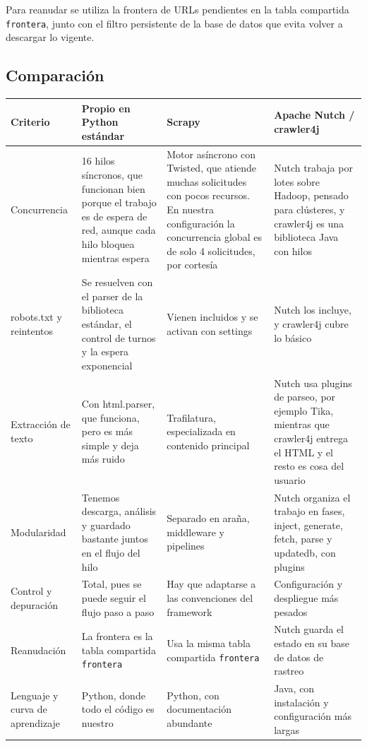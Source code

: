 \documentclass[11pt,spanish]{article}
\begin{document}
Para reanudar se utiliza la frontera de URLs pendientes en la tabla compartida \texttt{frontera}, junto con el filtro persistente de la base de datos que evita volver a descargar lo vigente.

\subsection{Comparación}

\begin{center}
\small
\begin{tabularx}{\linewidth}{lYYY}
\toprule
\textbf{Criterio} & \textbf{Propio en Python estándar} & \textbf{Scrapy} & \textbf{Apache Nutch / crawler4j} \\
\midrule
Concurrencia & 16 hilos síncronos, que funcionan bien porque el trabajo es de espera de red, aunque cada hilo bloquea mientras espera & Motor asíncrono con Twisted, que atiende muchas solicitudes con pocos recursos. En nuestra configuración la concurrencia global es de solo 4 solicitudes, por cortesía & Nutch trabaja por lotes sobre Hadoop, pensado para clústeres, y crawler4j es una biblioteca Java con hilos \\
robots.txt y reintentos & Se resuelven con el parser de la biblioteca estándar, el control de turnos y la espera exponencial & Vienen incluidos y se activan con settings & Nutch los incluye, y crawler4j cubre lo básico \\
Extracción de texto & Con html.parser, que funciona, pero es más simple y deja más ruido & Trafilatura, especializada en contenido principal & Nutch usa plugins de parseo, por ejemplo Tika, mientras que crawler4j entrega el HTML y el resto es cosa del usuario \\
Modularidad & Tenemos descarga, análisis y guardado bastante juntos en el flujo del hilo & Separado en araña, middleware y pipelines & Nutch organiza el trabajo en fases, inject, generate, fetch, parse y updatedb, con plugins \\
Control y depuración & Total, pues se puede seguir el flujo paso a paso & Hay que adaptarse a las convenciones del framework & Configuración y despliegue más pesados \\
Reanudación & La frontera es la tabla compartida \texttt{frontera} & Usa la misma tabla compartida \texttt{frontera} & Nutch guarda el estado en su base de datos de rastreo \\
Lenguaje y curva de aprendizaje & Python, donde todo el código es nuestro & Python, con documentación abundante & Java, con instalación y configuración más largas \\
\bottomrule
\end{tabularx}
\end{center}
\end{document}
